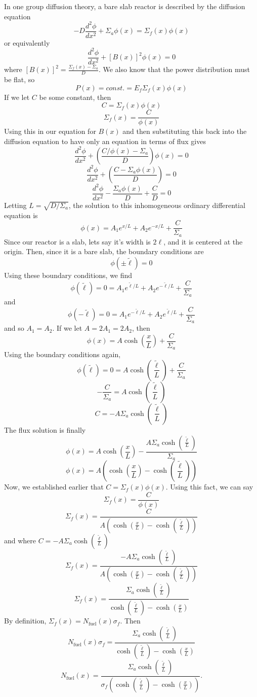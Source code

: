 \documentclass{article}
\newcommand{\Xs}{\Sigma}
\newcommand{\xs}{\sigma}
\begin{document}
In one group diffusion theory, a bare slab reactor is described by the diffusion equation
$$ -D \frac{d^2\phi}{dx^2} + \Xs_a \phi(x) = \Xs_f(x) \phi(x) $$
or equivalently
$$ \frac{d^2\phi}{dx^2} + [B(x)]^2\phi(x) = 0 $$
where $[B(x)]^2 = \frac{\Xs_f(x) - \Xs_a}{D}$. 
We also know that the power distribution must be flat, so
$$ P(x) = const. = E_f \Xs_f(x) \phi(x) $$
If we let $C$ be some constant, then
$$ C = \Xs_f(x)\phi(x) $$
$$ \Xs_f(x) = \frac{C}{\phi(x)} $$
Using this in our equation for $B(x)$ and then substituting this back into the diffusion equation to have only an equation in terms of flux gives
$$ \frac{d^2\phi}{dx^2} + \left(\frac{C/\phi(x) - \Xs_a}{D}\right)\phi(x) = 0 $$
$$ \frac{d^2\phi}{dx^2} + \left(\frac{C - \Xs_a\phi(x)}{D}\right) = 0 $$
$$ \frac{d^2\phi}{dx^2} - \frac{\Xs_a\phi(x)}{D} + \frac{C}{D} = 0 $$
Letting $L = \sqrt{D/\Xs_a}$, the solution to this inhomogeneous ordinary differential equation is
$$ \phi(x) = A_1 e^{x/L} + A_2 e^{-x/L} + \frac{C}{\Xs_a} $$
Since our reactor is a slab, lets say it's width is $2\ell$, and it is centered at the origin. Then, since it is a bare slab, the boundary conditions are
$$ \phi(\pm\tilde{\ell}) = 0 $$
Using these boundary conditions, we find
$$ \phi(\tilde{\ell}) = 0 = A_1 e^{\tilde{\ell}/L} + A_2 e^{-\tilde{\ell}/L} + \frac{C}{\Xs_a} $$
and 
$$ \phi(-\tilde{\ell}) = 0 = A_1 e^{-\tilde{\ell}/L} + A_2 e^{\tilde{\ell}/L} + \frac{C}{\Xs_a} $$
and so $A_1 = A_2$. If we let $A = 2A_1 = 2A_2$, then
$$ \phi(x) = A \cosh\left(\frac{x}{L}\right) + \frac{C}{\Xs_a} $$
Using the boundary conditions again,
$$ \phi(\tilde{\ell}) = 0 = A \cosh\left(\frac{\tilde{\ell}}{L}\right) + \frac{C}{\Xs_a} $$
$$ -\frac{C}{\Xs_a} = A \cosh\left(\frac{\tilde{\ell}}{L}\right) $$
$$ C = - A \Xs_a\cosh\left(\frac{\tilde{\ell}}{L}\right) $$
The flux solution is finally 
$$ \phi(x) = A \cosh\left(\frac{x}{L}\right) - \frac{A \Xs_a\cosh\left(\frac{\tilde{\ell}}{L}\right)}{\Xs_a} $$
$$ \phi(x) = A \left(\cosh\left(\frac{x}{L}\right) - \cosh\left(\frac{\tilde{\ell}}{L}\right)\right) $$
Now, we established earlier that $C = \Xs_f(x) \phi(x)$. Using this fact, we can say
$$ \Xs_f(x) = \frac{C}{\phi(x)} $$
$$ \Xs_f(x) = \frac{C}{A \left(\cosh\left(\frac{x}{L}\right) - \cosh\left(\frac{\tilde{\ell}}{L}\right)\right)} $$
and where $ C = - A \Xs_a\cosh\left(\frac{\tilde{\ell}}{L}\right) $
$$ \Xs_f(x) = \frac{- A \Xs_a\cosh\left(\frac{\tilde{\ell}}{L}\right)}{A \left(\cosh\left(\frac{x}{L}\right) - \cosh\left(\frac{\tilde{\ell}}{L}\right)\right)} $$
$$ \Xs_f(x) = \frac{\Xs_a\cosh\left(\frac{\tilde{\ell}}{L}\right)}{\cosh\left(\frac{\tilde{\ell}}{L}\right) - \cosh\left(\frac{x}{L}\right)} $$
By definition, $\Xs_f(x) = N_{\text{fuel}}(x)\xs_f$. Then
$$ N_{\text{fuel}}(x)\xs_f = \frac{\Xs_a\cosh\left(\frac{\tilde{\ell}}{L}\right)}{\cosh\left(\frac{\tilde{\ell}}{L}\right) - \cosh\left(\frac{x}{L}\right)} $$
$$\boxed{ N_{\text{fuel}}(x) = \frac{\Xs_a\cosh\left(\frac{\tilde{\ell}}{L}\right)}{\xs_f \left( \cosh\left(\frac{\tilde{\ell}}{L}\right) - \cosh\left(\frac{x}{L}\right)\right)} }.$$
\end{document}

